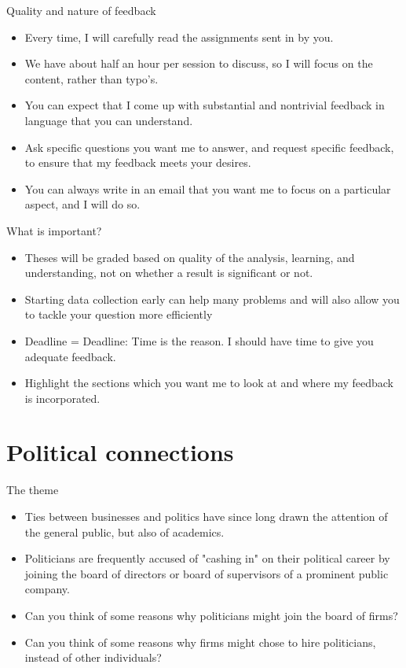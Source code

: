 \documentclass[aspectratio = 169, 12pt]{beamer}
\begin{document}
	\begin{frame}{Quality and nature of feedback}
	    \begin{itemize}
		    \item Every time, I will carefully read the assignments sent in by you.
		    \item We have about half an hour per session to discuss, so I will focus on the content, rather than typo's.
		    \item You can expect that I come up with substantial and nontrivial feedback in language that you can understand.
		    \item Ask specific questions you want me to answer, and request specific feedback, to ensure that my feedback meets your desires.
		    \item You can always write in an email that you want me to focus on a particular aspect, and I will do so. 
		\end{itemize}
	\end{frame}
	
	\begin{frame}{What is important?}
	    \begin{itemize}
	        \item Theses will be graded based on quality of the analysis, learning, and understanding, not on whether a result is significant or not.
	        
	        \item Starting data collection early can help many problems and will also allow you to tackle your question more efficiently
	        
	        \item Deadline = Deadline: Time is the reason. I should have time to give you adequate feedback.
	        
	        \item Highlight the sections which you want me to look at and where my feedback is incorporated.
	    \end{itemize}
	    
	\end{frame}
	
\section{Political connections}
	\begin{frame}{The theme}
	    \begin{itemize}
	        \item Ties between businesses and politics have since long drawn the attention of the general public, but also of academics. 
	        \item Politicians are frequently accused of "cashing in" on their political career by joining the board of directors or board of supervisors of a prominent public company. 
	        \item Can you think of some reasons why politicians might join the board of firms? 
	        \item Can you think of some reasons why firms might chose to hire politicians, instead of other individuals?
	    \end{itemize}
	\end{frame}
	
\end{document}
